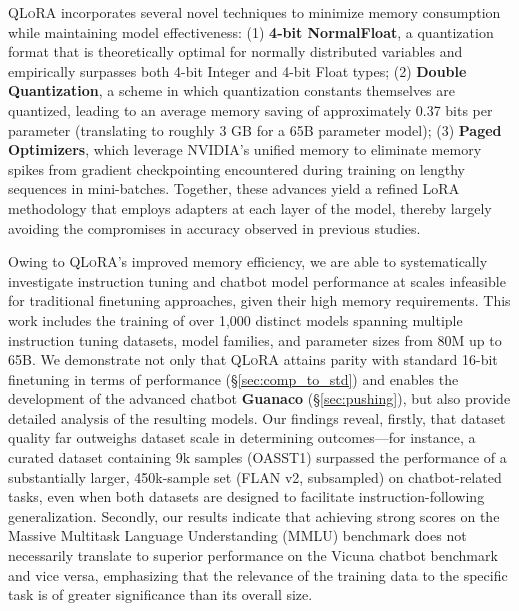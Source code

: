 \textsc{QLoRA} incorporates several novel techniques to minimize memory consumption while maintaining model effectiveness: (1) \textbf{4-bit NormalFloat}, a quantization format that is theoretically optimal for normally distributed variables and empirically surpasses both 4-bit Integer and 4-bit Float types; (2) \textbf{Double Quantization}, a scheme in which quantization constants themselves are quantized, leading to an average memory saving of approximately 0.37 bits per parameter (translating to roughly 3 GB for a 65B parameter model); (3) \textbf{Paged Optimizers}, which leverage NVIDIA’s unified memory to eliminate memory spikes from gradient checkpointing encountered during training on lengthy sequences in mini-batches. Together, these advances yield a refined LoRA methodology that employs adapters at each layer of the model, thereby largely avoiding the compromises in accuracy observed in previous studies.

Owing to \textsc{QLoRA}’s improved memory efficiency, we are able to systematically investigate instruction tuning and chatbot model performance at scales infeasible for traditional finetuning approaches, given their high memory requirements. This work includes the training of over 1,000 distinct models spanning multiple instruction tuning datasets, model families, and parameter sizes from 80M up to 65B. We demonstrate not only that \textsc{QLoRA} attains parity with standard 16-bit finetuning in terms of performance (\S\ref{sec:comp_to_std}) and enables the development of the advanced chatbot \textbf{Guanaco} (\S\ref{sec:pushing}), but also provide detailed analysis of the resulting models. Our findings reveal, firstly, that dataset quality far outweighs dataset scale in determining outcomes—for instance, a curated dataset containing 9k samples (OASST1) surpassed the performance of a substantially larger, 450k-sample set (FLAN v2, subsampled) on chatbot-related tasks, even when both datasets are designed to facilitate instruction-following generalization. Secondly, our results indicate that achieving strong scores on the Massive Multitask Language Understanding (MMLU) benchmark does not necessarily translate to superior performance on the Vicuna chatbot benchmark and vice versa, emphasizing that the relevance of the training data to the specific task is of greater significance than its overall size.

